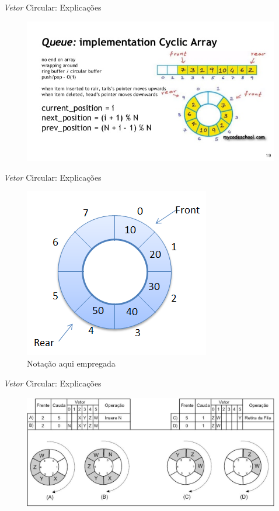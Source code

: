 \begin{frame}{\textit{Vetor} Circular: Explicações}

\begin{figure}[ht!]
				\centering
				\includegraphics[width=.8\textwidth,height=.6\textheight]{figs/fig_filas/fila_circular_explicacao_01.jpg}
			\end{figure} 

\end{frame}

\begin{frame}{\textit{Vetor} Circular: Explicações}

\begin{figure}[ht!]
			\centering
			\includegraphics[width=.5\textwidth]{figs/fig_filas/fila_circular_simples.png}
		\caption{Notação aqui empregada}
			\end{figure} 
\end{frame}


\begin{frame}{\textit{Vetor} Circular: Explicações}

\begin{figure}[ht!]
	\centering
		\includegraphics[width=.8\textwidth,height=5cm]{figs/fig_filas/fila_circular_explicacao_02.jpg}
			\end{figure} 
\end{frame}


